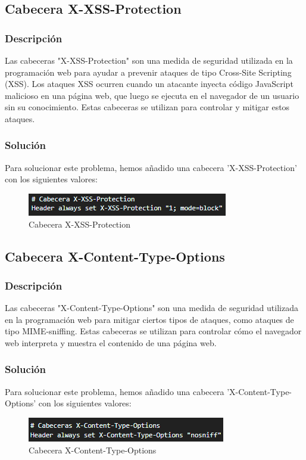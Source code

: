 \documentclass{report}
\begin{document}
            \subsection{Cabecera X-XSS-Protection}
                \subsubsection{Descripción}
                Las cabeceras "X-XSS-Protection" son una medida de seguridad utilizada en la programación web para ayudar a prevenir ataques de tipo Cross-Site Scripting (XSS). Los ataques XSS ocurren cuando un atacante inyecta código JavaScript malicioso en una página web, que luego se ejecuta en el navegador de un usuario sin su conocimiento. Estas cabeceras se utilizan para controlar y mitigar estos ataques.
                \subsubsection{Solución}
                    Para solucionar este problema, hemos añadido una cabecera 'X-XSS-Protection' con los siguientes valores:
                    \begin{figure}[H]
                        \centering
                        \includegraphics[width=\textwidth]{./img/vulnerabilidades/3.5/5.1.png}
                        \caption{Cabecera X-XSS-Protection}
                    \end{figure}
            \clearpage
            \subsection{Cabecera X-Content-Type-Options}
                \subsubsection{Descripción}
                Las cabeceras "X-Content-Type-Options" son una medida de seguridad utilizada en la programación web para mitigar ciertos tipos de ataques, como ataques de tipo MIME-sniffing. Estas cabeceras se utilizan para controlar cómo el navegador web interpreta y muestra el contenido de una página web.
                \subsubsection{Solución}
                    Para solucionar este problema, hemos añadido una cabecera 'X-Content-Type-Options' con los siguientes valores:
                    \begin{figure}[H]
                        \centering
                        \includegraphics[width=\textwidth]{./img/vulnerabilidades/3.5/6.1.png}
                        \caption{Cabecera X-Content-Type-Options}
                    \end{figure}
            \clearpage
\end{document}
